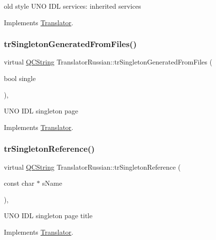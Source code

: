 old style U\+NO I\+DL services\+: inherited services 

Implements \mbox{\hyperlink{class_translator}{Translator}}.

\mbox{\label{class_translator_russian_a6e63a8dec90c1011af70e3842c5cdb70}} 
\subsubsection{\texorpdfstring{trSingletonGeneratedFromFiles()}{trSingletonGeneratedFromFiles()}}
{\footnotesize\ttfamily virtual \mbox{\hyperlink{class_q_c_string}{Q\+C\+String}} Translator\+Russian\+::tr\+Singleton\+Generated\+From\+Files (\begin{DoxyParamCaption}\item[{bool}]{single }\end{DoxyParamCaption})\hspace{0.3cm}{\ttfamily [inline]}, {\ttfamily [virtual]}}

U\+NO I\+DL singleton page 

Implements \mbox{\hyperlink{class_translator}{Translator}}.

\mbox{\label{class_translator_russian_a239c0a224e9cdbf69bc7f992a533ef7e}} 
\subsubsection{\texorpdfstring{trSingletonReference()}{trSingletonReference()}}
{\footnotesize\ttfamily virtual \mbox{\hyperlink{class_q_c_string}{Q\+C\+String}} Translator\+Russian\+::tr\+Singleton\+Reference (\begin{DoxyParamCaption}\item[{const char $\ast$}]{s\+Name }\end{DoxyParamCaption})\hspace{0.3cm}{\ttfamily [inline]}, {\ttfamily [virtual]}}

U\+NO I\+DL singleton page title 

Implements \mbox{\hyperlink{class_translator}{Translator}}.

